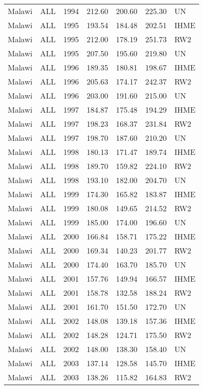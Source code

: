 \begin{longtable}{lllrrrl}
  Malawi & ALL & 1994 & 212.60 & 200.60 & 225.30 & UN \\ 
  Malawi & ALL & 1995 & 193.54 & 184.48 & 202.51 & IHME \\ 
  Malawi & ALL & 1995 & 212.00 & 178.19 & 251.73 & RW2 \\ 
  Malawi & ALL & 1995 & 207.50 & 195.60 & 219.80 & UN \\ 
  Malawi & ALL & 1996 & 189.35 & 180.81 & 198.67 & IHME \\ 
  Malawi & ALL & 1996 & 205.63 & 174.17 & 242.37 & RW2 \\ 
  Malawi & ALL & 1996 & 203.00 & 191.60 & 215.00 & UN \\ 
  Malawi & ALL & 1997 & 184.87 & 175.48 & 194.29 & IHME \\ 
  Malawi & ALL & 1997 & 198.23 & 168.37 & 231.84 & RW2 \\ 
  Malawi & ALL & 1997 & 198.70 & 187.60 & 210.20 & UN \\ 
  Malawi & ALL & 1998 & 180.13 & 171.47 & 189.74 & IHME \\ 
  Malawi & ALL & 1998 & 189.70 & 159.82 & 224.10 & RW2 \\ 
  Malawi & ALL & 1998 & 193.10 & 182.00 & 204.70 & UN \\ 
  Malawi & ALL & 1999 & 174.30 & 165.82 & 183.87 & IHME \\ 
  Malawi & ALL & 1999 & 180.08 & 149.65 & 214.52 & RW2 \\ 
  Malawi & ALL & 1999 & 185.00 & 174.00 & 196.60 & UN \\ 
  Malawi & ALL & 2000 & 166.84 & 158.71 & 175.22 & IHME \\ 
  Malawi & ALL & 2000 & 169.34 & 140.23 & 201.77 & RW2 \\ 
  Malawi & ALL & 2000 & 174.40 & 163.70 & 185.70 & UN \\ 
  Malawi & ALL & 2001 & 157.76 & 149.94 & 166.57 & IHME \\ 
  Malawi & ALL & 2001 & 158.78 & 132.58 & 188.24 & RW2 \\ 
  Malawi & ALL & 2001 & 161.70 & 151.50 & 172.70 & UN \\ 
  Malawi & ALL & 2002 & 148.08 & 139.18 & 157.36 & IHME \\ 
  Malawi & ALL & 2002 & 148.28 & 124.71 & 175.50 & RW2 \\ 
  Malawi & ALL & 2002 & 148.00 & 138.30 & 158.40 & UN \\ 
  Malawi & ALL & 2003 & 137.14 & 128.58 & 145.70 & IHME \\ 
  Malawi & ALL & 2003 & 138.26 & 115.82 & 164.83 & RW2 \\ 

\end{longtable}
